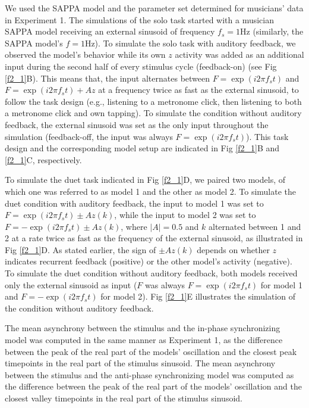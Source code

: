 \documentclass{report}
\begin{document}
We used the SAPPA model and the parameter set determined for musicians' data in Experiment 1. The simulations of the solo task started with a musician SAPPA model receiving an external sinusoid of frequency $f_s = 1$Hz (similarly, the SAPPA model's $f = 1$Hz). To simulate the solo task with auditory feedback, we observed the model's behavior while its own $z$ activity was added as an additional input during the second half of every stimulus cycle (feedback-on) (see Fig \ref{f2_1}B). This means that, the input alternates between $F = \exp(i2\pi f_s t)$ and $F = \exp(i2\pi f_s t) + Az$ at a frequency twice as fast as the external sinusoid, to follow the task design (e.g., listening to a metronome click, then listening to both a metronome click and own tapping). To simulate the condition without auditory feedback, the external sinusoid was set as the only input throughout the simulation (feedback-off, the input was always $F = \exp(i2\pi f_s t)$). This task design and the corresponding model setup are indicated in Fig \ref{f2_1}B and \ref{f2_1}C, respectively.

To simulate the duet task indicated in Fig \ref{f2_1}D, we paired two models, of which one was referred to as model 1 and the other as model 2. To simulate the duet condition with auditory feedback, the input to model 1 was set to $F = \exp(i2\pi f_s t) \pm Az(k)$, while the input to model 2 was set to $F = -\exp(i2\pi f_s t) \pm Az(k)$, where $|A| = 0.5$ and $k$ alternated between 1 and 2 at a rate twice as fast as the frequency of the external sinusoid, as illustrated in Fig \ref{f2_1}D. As stated earlier, the sign of $\pm Az(k)$ depends on whether $z$ indicates recurrent feedback (positive) or the other model's activity (negative). To simulate the duet condition without auditory feedback, both models received only the external sinusoid as input ($F$ was always $F = \exp(i2\pi f_s t)$ for model 1 and $F = -\exp(i2\pi f_s t)$ for model 2). Fig \ref{f2_1}E illustrates the simulation of the condition without auditory feedback.

The mean asynchrony between the stimulus and the in-phase synchronizing model was computed in the same manner as Experiment 1, as the difference between the peak of the real part of the models' oscillation and the closest peak timepoints in the real part of the stimulus sinusoid. The mean asynchrony between the stimulus and the anti-phase synchronizing model was computed as the difference between the peak of the real part of the models' oscillation and the closest valley timepoints in the real part of the stimulus sinusoid.
\end{document}
